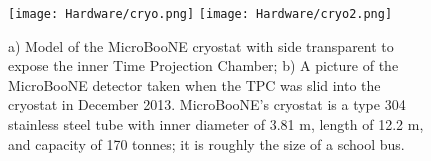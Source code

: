 \begin{figure}[H]
    \centering
\texttt{[image: Hardware/cryo.png]}
  \hspace{1mm}
\texttt{[image: Hardware/cryo2.png]}
\caption{a) Model of the MicroBooNE cryostat with side transparent to expose the inner Time Projection Chamber; b) A picture of the MicroBooNE detector taken when the TPC was slid into the cryostat in December 2013.  MicroBooNE's cryostat is a type 304 stainless steel tube with inner diameter of 3.81 m, length of 12.2 m, and capacity of 170 tonnes; it is roughly the size of a school bus. }
\label{fig:cryo2}
\end{figure}


